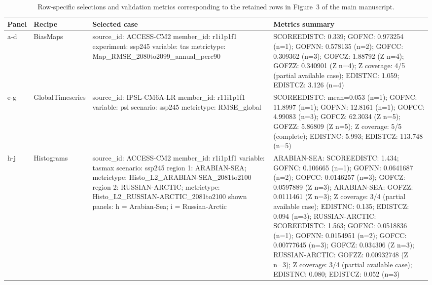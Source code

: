 \begin{table}[t]
\centering
\caption{Row-specific selections and validation metrics corresponding to the retained rows in Figure~3 of the main manuscript.}
\label{tab:validation-main-rowtext}
\footnotesize
\renewcommand{\arraystretch}{0.96}
\setlength{\tabcolsep}{4pt}
\begin{tabularx}{\textwidth}{@{}l l X X@{}}
\toprule
Panel & Recipe & Selected case & Metrics summary \\
\midrule
a-d & BiasMaps & source\_id: ACCESS-CM2 \newline member\_id: r1i1p1f1 \newline experiment: ssp245 \newline variable: tas \newline metrictype: Map\_RMSE\_2080to2099\_annual\_perc90 & SCOREEDISTC: 0.339; GOFNC: 0.973254 (n=1); GOFNN: 0.578135 (n=2); GOFCC: 0.309362 (n=3); GOFCZ: 1.88792 (Z n=4); GOFZZ: 0.340901 (Z n=4); Z coverage: 4/5 (partial available case); EDISTNC: 1.059; EDISTCZ: 3.126 (n=4) \\
e-g & GlobalTimeseries & source\_id: IPSL-CM6A-LR \newline member\_id: r11i1p1f1 \newline variable: psl \newline scenario: ssp245 \newline metrictype: RMSE\_global & SCOREEDISTC: mean=0.053 (n=1); GOFNC: 11.8997 (n=1); GOFNN: 12.8161 (n=1); GOFCC: 4.99083 (n=3); GOFCZ: 62.3034 (Z n=5); GOFZZ: 5.86809 (Z n=5); Z coverage: 5/5 (complete); EDISTNC: 5.993; EDISTCZ: 113.748 (n=5) \\
h-j & Histograms & source\_id: ACCESS-CM2 \newline member\_id: r1i1p1f1 \newline variable: tasmax \newline scenario: ssp245 \newline region 1: ARABIAN-SEA; metrictype: Histo\_L2\_ARABIAN-SEA\_2081to2100 \newline region 2: RUSSIAN-ARCTIC; metrictype: Histo\_L2\_RUSSIAN-ARCTIC\_2081to2100 \newline shown panels: h = Arabian-Sea; i = Russian-Arctic & ARABIAN-SEA: SCOREEDISTC: 1.434; GOFNC: 0.106665 (n=1); GOFNN: 0.0641687 (n=2); GOFCC: 0.0146257 (n=3); GOFCZ: 0.0597889 (Z n=3); ARABIAN-SEA: GOFZZ: 0.0111461 (Z n=3); Z coverage: 3/4 (partial available case); EDISTNC: 0.135; EDISTCZ: 0.094 (n=3); RUSSIAN-ARCTIC: SCOREEDISTC: 1.563; GOFNC: 0.0518836 (n=1); GOFNN: 0.0154951 (n=2); GOFCC: 0.00777645 (n=3); GOFCZ: 0.034306 (Z n=3); RUSSIAN-ARCTIC: GOFZZ: 0.00932748 (Z n=3); Z coverage: 3/4 (partial available case); EDISTNC: 0.080; EDISTCZ: 0.052 (n=3) \\

\end{tabularx}
\end{table}
